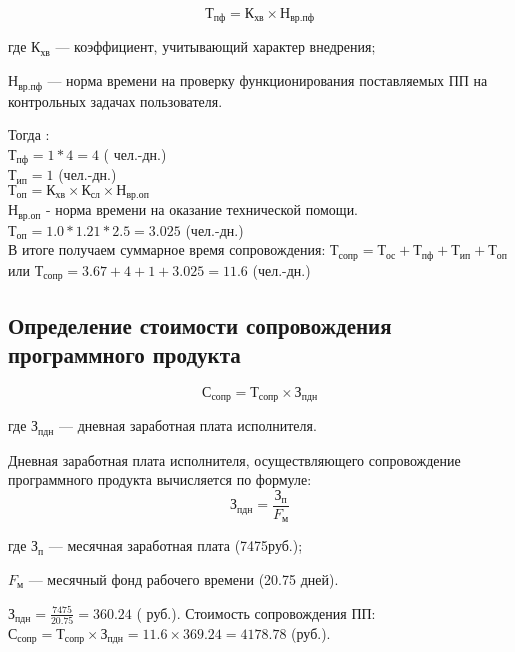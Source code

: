 \begin{equation}
	Т_{пф} = К_{хв} \times Н_{вр.пф}
\end{equation}
\begin{ESKDexplanation}
	\item[где ] $К_{хв}$ --- коэффициент, учитывающий характер внедрения;
	\item{} $Н_{вр.пф}$ --- норма времени на проверку функционирования поставляемых ПП на контрольных задачах пользователя.
\end{ESKDexplanation}
Тогда : \\
$Т_{пф} = 1 * 4 = 4$ ( чел.-дн.) \\
$Т_{ип} = 1$ (чел.-дн.) \\
$Т_{оп} = К_{хв} \times К_{сл} \times Н_{вр.оп}$ \\
$Н_{вр.оп}$ - норма времени на оказание технической помощи. \\
$Т_{оп} = 1.0 * 1.21 * 2.5 = 3.025$ (чел.-дн.) \\
В итоге получаем суммарное время сопровождения:
$Т_{сопр} = Т_{ос} + Т_{пф} + Т_{ип} + Т_{оп}$ или $Т_{сопр} = 3.67 + 4 + 1 + 3.025 = 11.6$ (чел.-дн.)


\subsection{Определение стоимости сопровождения программного продукта}
\begin{equation}С_{сопр} = Т_{сопр} \times З_{пдн}\end{equation}
\begin{ESKDexplanation}
	\item[где ]{} $З_{пдн}$ --- дневная заработная плата исполнителя.
\end{ESKDexplanation}
Дневная заработная плата исполнителя, осуществляющего сопровождение программного продукта вычисляется по формуле:
\begin{equation}З_{пдн} = \frac{З_{п}}{F_{м}}\end{equation}
\begin{ESKDexplanation}
	\item[где ]{} $З_{п}$ --- месячная заработная плата (7475руб.);
	\item{} $F_{м}$ --- месячный фонд рабочего времени (20.75 дней).
\end{ESKDexplanation}
$З_{пдн} = \frac{7475}{20.75} = 360.24$ ( руб.).
Стоимость сопровождения ПП: $С_{сопр} = Т_{сопр} \times З_{пдн} = 11.6 \times 369.24 = 4178.78$ (руб.).



